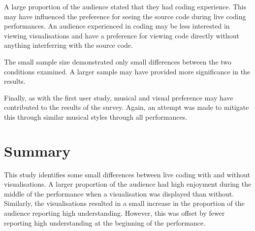 
A large proportion of the audience stated that they had coding experience. This may have influenced the preference for seeing the source code during live coding performances. An audience experienced in coding may be less interested in viewing visualisations and have a preference for viewing code directly without anything interferring with the source code.

The small sample size demonstrated only small differences between the two conditions examined. A larger sample may have provided more significance in the results.

Finally, as with the first user study, musical and visual preference may have contributed to the results of the survey. Again, an attempt was made to mitigate this through similar musical styles through all performances.

\section{Summary}

This study identifies some small differences between live coding with and without visualisations. A larger proportion of the audience had high enjoyment during the middle of the performance when a visualisation was displayed than without. Similarly, the visualisations resulted in a small increase in the proportion of the audience reporting high understanding. However, this was offset by fewer reporting high understanding at the beginning of the performance. 










